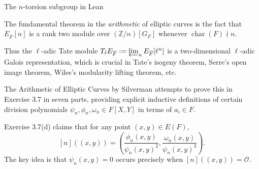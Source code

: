 \documentclass[10pt]{beamer}
\begin{document}
\begin{frame}[t]{The $ n $-torsion subgroup in Lean}

The fundamental theorem in the \emph{arithmetic} of elliptic curves is the fact that $ E_{\overline{F}}[n] $ is a rank two module over $ (\mathbb{Z} / n)[G_F] $ whenever $ \operatorname{char}(F) \nmid n $.

\pause

\vspace{0.5cm} Thus the $ \ell $-adic Tate module $ T_\ell E_{\overline{F}} := \varprojlim_n E_{\overline{F}}[\ell^n] $ is a two-dimensional $ \ell $-adic Galois representation, which is crucial in Tate's isogeny theorem, Serre's open image theorem, Wiles's modularity lifting theorem, etc.

\pause

\vspace{0.5cm} The Arithmetic of Elliptic Curves by Silverman attempts to prove this in Exercise 3.7 in seven parts, providing explicit inductive definitions of certain division polynomials $ \psi_n, \phi_n, \omega_n \in F[X, Y] $ in terms of $ a_i \in F $.

\pause

\vspace{0.5cm} Exercise 3.7(d) claims that for any point $ (x, y) \in E(F) $,
$$ [n]((x, y)) = \left(\dfrac{\phi_n(x, y)}{\psi_n(x, y)^2}, \dfrac{\omega_n(x, y)}{\psi_n(x, y)^3}\right). $$
The key idea is that $ \psi_n(x, y) = 0 $ occurs precisely when $ [n]((x, y)) = \mathcal{O} $.

\end{frame}
\end{document}

